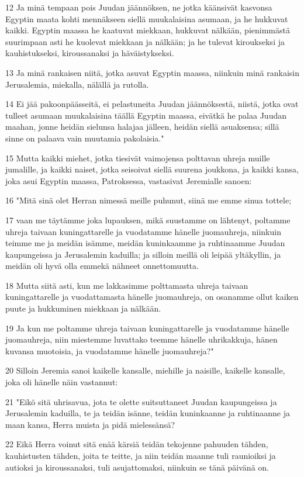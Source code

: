 \par 12 Ja minä tempaan pois Juudan jäännöksen, ne jotka käänsivät kasvonsa Egyptin maata kohti mennäkseen siellä muukalaisina asumaan, ja he hukkuvat kaikki. Egyptin maassa he kaatuvat miekkaan, hukkuvat nälkään, pienimmästä suurimpaan asti he kuolevat miekkaan ja nälkään; ja he tulevat kiroukseksi ja kauhistukseksi, kiroussanaksi ja häväistykseksi.
\par 13 Ja minä rankaisen niitä, jotka asuvat Egyptin maassa, niinkuin minä rankaisin Jerusalemia, miekalla, nälällä ja rutolla.
\par 14 Ei jää pakoonpäässeitä, ei pelastuneita Juudan jäännöksestä, niistä, jotka ovat tulleet asumaan muukalaisina täällä Egyptin maassa, eivätkä he palaa Juudan maahan, jonne heidän sielunsa halajaa jälleen, heidän siellä asuaksensa; sillä sinne on palaava vain muutamia pakolaisia."
\par 15 Mutta kaikki miehet, jotka tiesivät vaimojensa polttavan uhreja muille jumalille, ja kaikki naiset, jotka seisoivat siellä suurena joukkona, ja kaikki kansa, joka asui Egyptin maassa, Patroksessa, vastasivat Jeremialle sanoen:
\par 16 "Mitä sinä olet Herran nimessä meille puhunut, siinä me emme sinua tottele;
\par 17 vaan me täytämme joka lupauksen, mikä suustamme on lähtenyt, poltamme uhreja taivaan kuningattarelle ja vuodatamme hänelle juomauhreja, niinkuin teimme me ja meidän isämme, meidän kuninkaamme ja ruhtinaamme Juudan kaupungeissa ja Jerusalemin kaduilla; ja silloin meillä oli leipää yltäkyllin, ja meidän oli hyvä olla emmekä nähneet onnettomuutta.
\par 18 Mutta siitä asti, kun me lakkasimme polttamasta uhreja taivaan kuningattarelle ja vuodattamasta hänelle juomauhreja, on osanamme ollut kaiken puute ja hukkuminen miekkaan ja nälkään.
\par 19 Ja kun me poltamme uhreja taivaan kuningattarelle ja vuodatamme hänelle juomauhreja, niin miestemme luvattako teemme hänelle uhrikakkuja, hänen kuvansa muotoisia, ja vuodatamme hänelle juomauhreja?"
\par 20 Silloin Jeremia sanoi kaikelle kansalle, miehille ja naisille, kaikelle kansalle, joka oli hänelle näin vastannut:
\par 21 "Eikö sitä uhrisavua, jota te olette suitsuttaneet Juudan kaupungeissa ja Jerusalemin kaduilla, te ja teidän isänne, teidän kuninkaanne ja ruhtinaanne ja maan kansa, Herra muista ja pidä mielessänsä?
\par 22 Eikä Herra voinut sitä enää kärsiä teidän tekojenne pahuuden tähden, kauhistusten tähden, joita te teitte, ja niin teidän maanne tuli raunioiksi ja autioksi ja kiroussanaksi, tuli asujattomaksi, niinkuin se tänä päivänä on.
